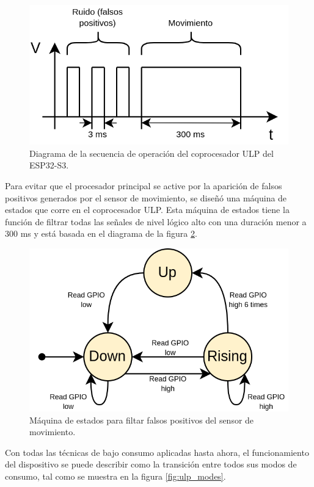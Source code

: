 \begin{figure}[h]
	\centering
	\includegraphics[scale=0.40]{./Figures/ulp_pir_noise.png}
	\caption{Diagrama de la secuencia de operación del coprocesador ULP del ESP32-S3.}
	\label{fig:ulp_pir_noise}
\end{figure}

Para evitar que el procesador principal se active por la aparición de falsos positivos generados por el sensor de movimiento, se diseñó una máquina de estados que corre en el coprocesador ULP. Esta máquina de estados tiene la función de filtrar todas las señales de nivel lógico alto con una duración menor a 300 ms y está basada en el diagrama de la figura \ref{fig:ulp_fsm}.

\begin{figure}[h]
	\centering
	\includegraphics[scale=0.40]{./Figures/ulp_fsm.png}
	\caption{Máquina de estados para filtar falsos positivos del sensor de movimiento.}
	\label{fig:ulp_fsm}
\end{figure}

Con todas las técnicas de bajo consumo aplicadas hasta ahora, el funcionamiento del dispositivo se puede describir como la transición entre todos sus modos de consumo, tal como se muestra en la figura \ref{fig:ulp_modes}.

